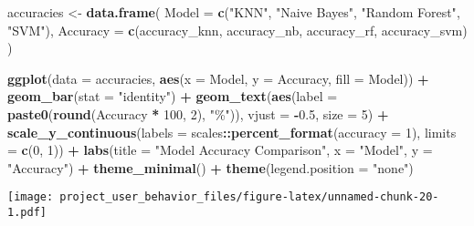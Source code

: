 \documentclass[
]{article}
\newenvironment{Shaded}{\begin{snugshade}}{\end{snugshade}}
\newcommand{\AttributeTok}[1]{\textcolor[rgb]{0.13,0.29,0.53}{#1}}
\newcommand{\DecValTok}[1]{\textcolor[rgb]{0.00,0.00,0.81}{#1}}
\newcommand{\FloatTok}[1]{\textcolor[rgb]{0.00,0.00,0.81}{#1}}
\newcommand{\FunctionTok}[1]{\textcolor[rgb]{0.13,0.29,0.53}{\textbf{#1}}}
\newcommand{\NormalTok}[1]{#1}
\newcommand{\OtherTok}[1]{\textcolor[rgb]{0.56,0.35,0.01}{#1}}
\newcommand{\SpecialCharTok}[1]{\textcolor[rgb]{0.81,0.36,0.00}{\textbf{#1}}}
\newcommand{\StringTok}[1]{\textcolor[rgb]{0.31,0.60,0.02}{#1}}
\begin{document}
\begin{Shaded}
\begin{Highlighting}[]
\NormalTok{accuracies }\OtherTok{\textless{}{-}} \FunctionTok{data.frame}\NormalTok{(}
  \AttributeTok{Model =} \FunctionTok{c}\NormalTok{(}\StringTok{"KNN"}\NormalTok{, }\StringTok{"Naive Bayes"}\NormalTok{, }\StringTok{"Random Forest"}\NormalTok{, }\StringTok{"SVM"}\NormalTok{),}
  \AttributeTok{Accuracy =} \FunctionTok{c}\NormalTok{(accuracy\_knn, accuracy\_nb, accuracy\_rf, accuracy\_svm)}
\NormalTok{)}

\FunctionTok{ggplot}\NormalTok{(}\AttributeTok{data =}\NormalTok{ accuracies, }\FunctionTok{aes}\NormalTok{(}\AttributeTok{x =}\NormalTok{ Model, }\AttributeTok{y =}\NormalTok{ Accuracy, }\AttributeTok{fill =}\NormalTok{ Model)) }\SpecialCharTok{+}
  \FunctionTok{geom\_bar}\NormalTok{(}\AttributeTok{stat =} \StringTok{"identity"}\NormalTok{) }\SpecialCharTok{+}
  \FunctionTok{geom\_text}\NormalTok{(}\FunctionTok{aes}\NormalTok{(}\AttributeTok{label =} \FunctionTok{paste0}\NormalTok{(}\FunctionTok{round}\NormalTok{(Accuracy }\SpecialCharTok{*} \DecValTok{100}\NormalTok{, }\DecValTok{2}\NormalTok{), }\StringTok{"\%"}\NormalTok{)), }\AttributeTok{vjust =} \SpecialCharTok{{-}}\FloatTok{0.5}\NormalTok{, }\AttributeTok{size =} \DecValTok{5}\NormalTok{) }\SpecialCharTok{+}
  \FunctionTok{scale\_y\_continuous}\NormalTok{(}\AttributeTok{labels =}\NormalTok{ scales}\SpecialCharTok{::}\FunctionTok{percent\_format}\NormalTok{(}\AttributeTok{accuracy =} \DecValTok{1}\NormalTok{), }\AttributeTok{limits =} \FunctionTok{c}\NormalTok{(}\DecValTok{0}\NormalTok{, }\DecValTok{1}\NormalTok{)) }\SpecialCharTok{+}
  \FunctionTok{labs}\NormalTok{(}\AttributeTok{title =} \StringTok{"Model Accuracy Comparison"}\NormalTok{, }\AttributeTok{x =} \StringTok{"Model"}\NormalTok{, }\AttributeTok{y =} \StringTok{"Accuracy"}\NormalTok{) }\SpecialCharTok{+}
  \FunctionTok{theme\_minimal}\NormalTok{() }\SpecialCharTok{+}
  \FunctionTok{theme}\NormalTok{(}\AttributeTok{legend.position =} \StringTok{"none"}\NormalTok{)}
\end{Highlighting}
\end{Shaded}

\texttt{[image: project\_user\_behavior\_files/figure-latex/unnamed-chunk-20-1.pdf]}
\end{document}
